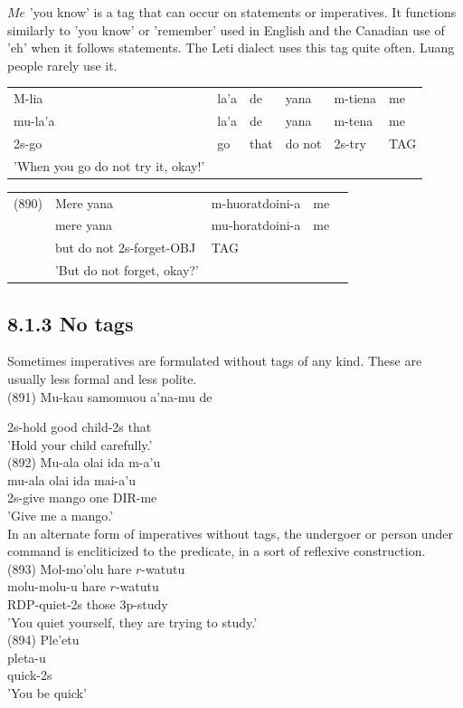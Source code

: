 \documentclass[10pt]{article}
\begin{document}
\(M e\) 'you know' is a tag that can occur on statements or imperatives. It functions similarly to 'you know' or 'remember' used in English and the Canadian use of 'eh' when it follows statements. The Leti dialect uses this tag quite often. Luang people rarely use it.

\begin{center}
\begin{tabular}{llllll}
M-lia & la'a & de & yana & m-tiena & me \\
mu-la'a & la'a & de & yana & m-tena & me \\
2s-go & go & that & do not & 2s-try & TAG \\
'When you go do not try it, okay!' &  &  &  &  &  \\
\end{tabular}
\end{center}

\begin{center}
\begin{tabular}{lllll}
(890) & Mere yana & m-huoratdoini-a & me \\
 & mere yana & mu-horatdoini-a & me \\
 & but do not 2s-forget-OBJ & TAG &  \\
 & 'But do not forget, okay?' &  &  \\
\end{tabular}
\end{center}

\subsection*{8.1.3 No tags}
Sometimes imperatives are formulated without tags of any kind. These are usually less formal and less polite.\\
(891) Mu-kau samomuou a’na-mu de

2s-hold good child-2s that\\
'Hold your child carefully.'\\
(892) Mu-ala olai ida m-a’u\\
mu-ala olai ida mai-a'u\\
2s-give mango one DIR-me\\
'Give me a mango.'\\
In an alternate form of imperatives without tags, the undergoer or person under command is encliticized to the predicate, in a sort of reflexive construction.\\
(893) Mol-mo'olu hare \(r\)-watutu\\
molu-molu-u hare \(r\)-watutu\\
RDP-quiet-2s those 3p-study\\
'You quiet yourself, they are trying to study.'\\
(894) Ple'etu\\
pleta-u\\
quick-2s\\
'You be quick'
\end{document}
